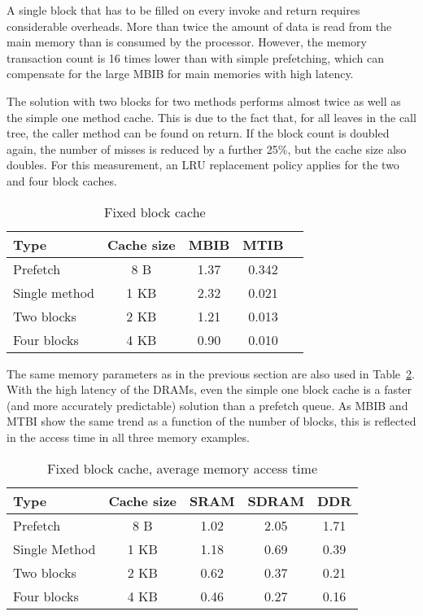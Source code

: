 A single block that has to be filled on every invoke and return
requires considerable overheads. More than twice the amount of data
is read from the main memory than is consumed by the processor.
However, the memory transaction count is 16 times lower than with
simple prefetching, which can compensate for the large MBIB for main
memories with high latency.

The solution with two blocks for two methods performs almost twice
as well as the simple one method cache. This is due to the fact
that, for all leaves in the call tree, the caller method can be
found on return. If the block count is doubled again, the number of
misses is reduced by a further 25\%, but the cache size also
doubles. For this measurement, an LRU replacement policy applies for
the two and four block caches.

\begin{table}
    \centering
    \begin{tabular}{lcccc}
    \toprule

    Type & Cache size & MBIB & MTIB \\

    \midrule
        Prefetch & 8 B & 1.37 & 0.342  \\
        Single method & 1 KB & 2.32 & 0.021  \\
        Two blocks & 2 KB & 1.21 & 0.013  \\
        Four blocks & 4 KB & 0.90 & 0.010  \\
    \bottomrule

    \end{tabular}
    \caption{Fixed block cache}
    \label{tab_cache_block}
\end{table}

The same memory parameters as in the previous section are also used
in Table~\ref{tab_cache_block_mem}. With the high latency of the
DRAMs, even the simple one block cache is a faster (and more
accurately predictable) solution than a prefetch queue. As MBIB and
MTBI show the same trend as a function of the number of blocks, this
is reflected in the access time in all three memory examples.

\begin{table}
    \centering
    \begin{tabular}{lcccc}
    \toprule

    Type & Cache size & SRAM & SDRAM & DDR \\

    \midrule
        Prefetch & 8 B & 1.02 & 2.05 & 1.71 \\
        Single Method & 1 KB & 1.18 & 0.69 & 0.39 \\
        Two blocks & 2 KB & 0.62 & 0.37 & 0.21 \\
        Four blocks & 4 KB & 0.46 & 0.27 & 0.16 \\
    \bottomrule

    \end{tabular}
    \caption{Fixed block cache, average memory access time}
    \label{tab_cache_block_mem}
\end{table}

